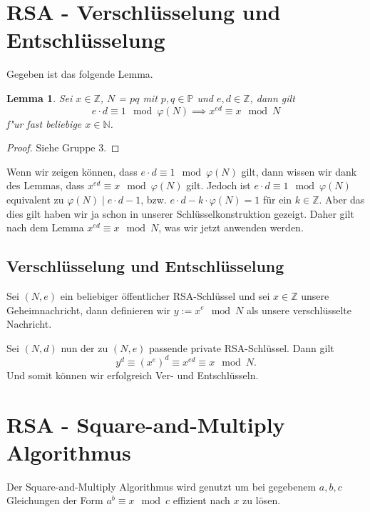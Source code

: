\documentclass[11pt]{article}
\newtheorem*{lemma}{Lemma}
\begin{document}
\section{RSA - Verschlüsselung und Entschlüsselung}
Gegeben ist das folgende Lemma.
\begin{lemma}
    Sei $x \in \mathbb{Z}$, $N$ = $pq$ mit $p,q \in \mathbb{P}$ und $e,d \in \mathbb{Z}$, dann gilt
    \[e \cdot d \equiv 1 \mod \varphi(N) \implies x^{ed} \equiv x \mod N\]
    f"ur fast beliebige $x \in \mathbb{N}$.
\end{lemma}
\begin{proof}
    Siehe Gruppe 3.
\end{proof}
Wenn wir zeigen k\"onnen, dass $e \cdot d \equiv 1 \mod \varphi(N)$ gilt, dann wissen wir dank des Lemmas, dass
$x^{ed} \equiv x \mod \varphi(N)$ gilt. Jedoch ist $e \cdot d \equiv 1 \mod \varphi(N)$  equivalent zu $\varphi(N) 
\mid e\cdot d -1$, bzw. $e\cdot d - k \cdot \varphi(N) = 1$ f\"ur ein $k \in \mathbb{Z}$. Aber das dies gilt haben wir 
ja schon in unserer Schl\"usselkonstruktion gezeigt. Daher gilt nach dem Lemma $x^{ed} \equiv x \mod N$, was wir jetzt anwenden werden.
\subsection{Verschl\"usselung und Entschl\"usselung}
Sei $(N,e)$ ein beliebiger \"offentlicher RSA-Schl\"ussel und 
sei $x \in \mathbb{Z}$ unsere Geheimnachricht, dann definieren wir $y := x^e \mod N$ als unsere verschl\"usselte Nachricht.

Sei $(N,d)$ nun der zu $(N,e)$ passende private RSA-Schl\"ussel. Dann gilt \[y^d \equiv (x^e)^d \equiv x^{ed} \equiv x \mod N.\]
Und somit k\"onnen wir erfolgreich Ver- und Entschl\"usseln.

\section{RSA - Square-and-Multiply Algorithmus}
Der Square-and-Multiply Algorithmus wird genutzt um bei gegebenem $a,b,c$ Gleichungen der Form $a^b \equiv x \mod c$ effizient
nach $x$ zu l\"osen. 
\end{document}
